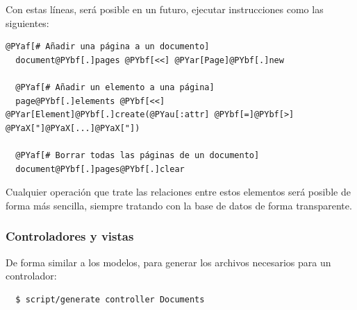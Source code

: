 %
%


Con estas líneas, será posible en un futuro, ejecutar instrucciones como las siguientes:

\begin{Verbatim}[commandchars=@\[\]]
  @PYaf[# Añadir una página a un documento]
  document@PYbf[.]pages @PYbf[<<] @PYar[Page]@PYbf[.]new  
  
  @PYaf[# Añadir un elemento a una página]
  page@PYbf[.]elements @PYbf[<<] @PYar[Element]@PYbf[.]create(@PYau[:attr] @PYbf[=]@PYbf[>] @PYaX["]@PYaX[...]@PYaX["]) 
  
  @PYaf[# Borrar todas las páginas de un documento]
  document@PYbf[.]pages@PYbf[.]clear
\end{Verbatim}

%  
%  

Cualquier operación que trate las relaciones entre estos elementos será posible de forma más sencilla, siempre tratando con la base de datos de forma transparente. 


\subsubsection{Controladores y vistas} %
\label{ssub:controlador}

De forma similar a los modelos, para generar los archivos necesarios para un controlador:

\begin{verbatim}
  $ script/generate controller Documents
\end{verbatim}

